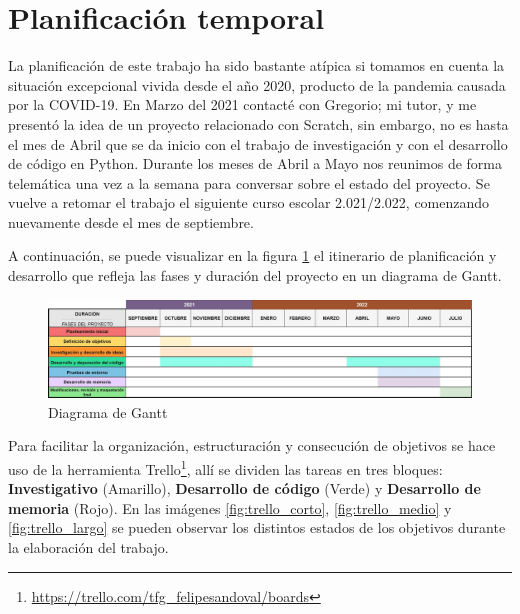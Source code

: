 \documentclass[a4paper, 12pt]{book}
\begin{document}
\section{Planificación temporal}
\label{sec:planificacion-temporal}


La planificación de este trabajo ha sido bastante atípica si tomamos en cuenta la situación excepcional vivida desde el año 2020, producto de la pandemia causada por la COVID-19. En Marzo del 2021 contacté con Gregorio; mi tutor, y me presentó la idea de un proyecto relacionado con Scratch, sin embargo, no es hasta el mes de Abril que se da inicio con el trabajo de investigación y con el desarrollo de código en Python. Durante los meses de Abril a Mayo nos reunimos de forma telemática una vez a la semana para conversar sobre el estado del proyecto. Se vuelve a retomar el trabajo el siguiente curso escolar 2.021/2.022, comenzando nuevamente desde el mes de septiembre.

A continuación, se puede visualizar en la figura \ref{fig:diagrama_gantt} el itinerario de planificación y desarrollo que refleja las fases y duración del proyecto en un diagrama de Gantt.

\begin{figure}[htb!]
	\centering
    \includegraphics[width=17cm, keepaspectratio]{img/gantt.jpg}
    \caption{Diagrama de Gantt}
    \label{fig:diagrama_gantt}
\end{figure}

\pagebreak 
Para facilitar la organización, estructuración y consecución de objetivos se hace uso de la herramienta Trello\footnote{\url{https://trello.com/tfg_felipesandoval/boards}}, allí se dividen las tareas en tres bloques: \textbf{Investigativo} (Amarillo), \textbf{Desarrollo de código} (Verde) y \textbf{Desarrollo de memoria} (Rojo). En las imágenes \ref{fig:trello_corto}, \ref{fig:trello_medio} y \ref{fig:trello_largo} se pueden observar los distintos estados de los objetivos durante la elaboración del trabajo.
\end{document}
